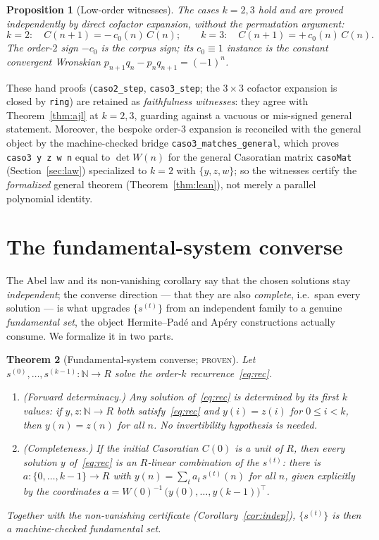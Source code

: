 \documentclass[11pt]{article}
\newtheorem{theorem}{Theorem}
\newtheorem{proposition}[theorem]{Proposition}
\newcommand{\N}{\mathbb{N}}
\newcommand{\Caso}{C}
\newcommand{\CasoM}{W}
\begin{document}
\begin{proposition}[Low-order witnesses]\label{prop:lowk}
The cases $k=2,3$ hold and are proved independently by direct cofactor expansion,
without the permutation argument:
\[
  k=2:\quad \Caso(n+1)=-\,c_0(n)\,\Caso(n);
  \qquad
  k=3:\quad \Caso(n+1)=+\,c_0(n)\,\Caso(n).
\]
The order-$2$ sign $-c_0$ is the corpus sign; its $c_0\equiv1$ instance is the
constant convergent Wronskian $p_{n+1}q_n-p_nq_{n+1}=(-1)^n$.
\end{proposition}

These hand proofs (\texttt{caso2\_step}, \texttt{caso3\_step}; the $3\times3$
cofactor expansion is closed by \texttt{ring}) are retained as \emph{faithfulness
witnesses}: they agree with Theorem~\ref{thm:ajl} at $k=2,3$, guarding against a
vacuous or mis-signed general statement. Moreover, the bespoke order-$3$ expansion is
reconciled with the general object by the machine-checked bridge
\texttt{caso3\_matches\_general}, which proves \texttt{caso3 y z w n} equal to
$\det\CasoM(n)$ for the general Casoratian matrix \texttt{casoMat} (Section~\ref{sec:law})
specialized to $k=2$ with $\{y,z,w\}$; so the witnesses certify the \emph{formalized}
general theorem (Theorem~\ref{thm:lean}), not merely a parallel polynomial identity.

\section{The fundamental-system converse}\label{sec:converse}

The Abel law and its non-vanishing corollary say that the chosen solutions stay
\emph{independent}; the converse direction --- that they are also \emph{complete},
i.e.\ span every solution --- is what upgrades $\{s^{(t)}\}$ from an independent family
to a genuine \emph{fundamental set}, the object Hermite--Pad\'e and Ap\'ery
constructions actually consume. We formalize it in two parts.

\begin{theorem}[Fundamental-system converse; \textsc{proven}]\label{thm:converse}
Let $s^{(0)},\dots,s^{(k-1)}\colon\N\to R$ solve the order-$k$ recurrence~\eqref{eq:rec}.
\begin{enumerate}
\item[\textup{(a)}] \emph{(Forward determinacy.)} Any solution of~\eqref{eq:rec} is
determined by its first $k$ values: if $y,z\colon\N\to R$ both satisfy~\eqref{eq:rec}
and $y(i)=z(i)$ for $0\le i<k$, then $y(n)=z(n)$ for all $n$. No invertibility
hypothesis is needed.
\item[\textup{(b)}] \emph{(Completeness.)} If the initial Casoratian $\Caso(0)$ is a
unit of $R$, then every solution $y$ of~\eqref{eq:rec} is an $R$-linear combination of
the $s^{(t)}$: there is $a\colon\{0,\dots,k-1\}\to R$ with
$y(n)=\sum_{t} a_t\, s^{(t)}(n)$ for all $n$, given explicitly by the coordinates
$a=\CasoM(0)^{-1}\,\big(y(0),\dots,y(k-1)\big)^{\!\top}$.
\end{enumerate}
Together with the non-vanishing certificate (Corollary~\ref{cor:indep}), $\{s^{(t)}\}$
is then a machine-checked fundamental set.
\end{theorem}
\end{document}
